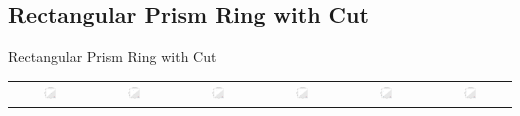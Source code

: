 \documentclass[xcolor=dvipsnames]{beamer}
\begin{document}
\subsection{Rectangular Prism Ring with Cut}
\begin{frame}{Rectangular Prism Ring with Cut}
\begin{table}[H]
\begin{tabular}{cccccc}
\includegraphics[width=0.18\textwidth]{Final Run, (rect prism ring 40 mm cut) persdia.png} &
\includegraphics[width=0.18\textwidth]{Final Run, (rect prism ring 35 mm cut) persdia.png} &  
\includegraphics[width=0.18\textwidth]{Final Run, (rect prism ring 30 mm cut) persdia.png} &
\includegraphics[width=0.18\textwidth]{Final Run, (rect prism ring 25 mm cut) persdia.png} & 
\includegraphics[width=0.18\textwidth]{Final Run, (rect prism ring 20 mm cut) persdia.png} & 
\includegraphics[width=0.18\textwidth]{Final Run, (rect prism ring 15 mm cut) persdia.png} \\

\end{tabular}
\end{table}
\end{frame}
\end{document}

